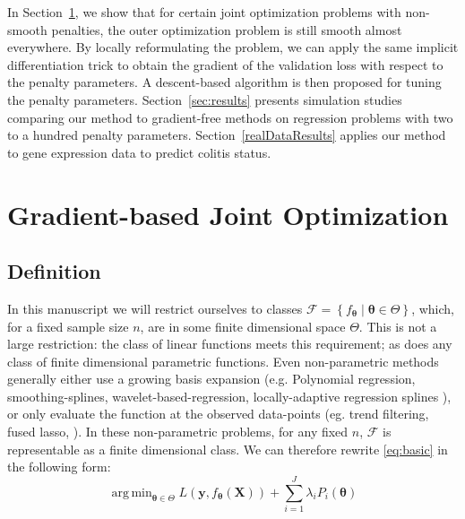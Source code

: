 \documentclass[12pt]{article}
\DeclareMathOperator*{\argmin}{arg\,min}
\begin{document}
In Section~\ref{defineDescJointOpt}, we show that for certain joint optimization problems with non-smooth penalties, the outer optimization problem is still smooth almost everywhere. By locally reformulating the problem, we can apply the same implicit differentiation trick to obtain the gradient of the validation loss with respect to the penalty parameters. A descent-based algorithm is then proposed for tuning the penalty parameters. Section~\ref{sec:results} presents simulation studies comparing our method to gradient-free methods on regression problems with two to a hundred penalty parameters. Section~\ref{realDataResults} applies our method to gene expression data to predict colitis status.

\section{Gradient-based Joint Optimization}\label{defineDescJointOpt}
\subsection{Definition}
In this manuscript we will restrict ourselves to classes $\mathcal{F} = \left\{f_{\boldsymbol \theta}\middle| \boldsymbol \theta\in\Theta\right\}$, which, for a fixed sample size $n$, are in some finite dimensional space $\Theta$. This is not a large restriction: the class of linear functions meets this requirement; as does any class of finite dimensional parametric functions. Even non-parametric methods generally either use a growing basis expansion (e.g. Polynomial regression, smoothing-splines, wavelet-based-regression, locally-adaptive regression splines \citep{tsybakov2008introduction, wahba1981spline, donoho1994ideal, mammen1997locally}), or only evaluate the function at the observed data-points (eg. trend filtering, fused lasso, \citep{kim2009ell_1, tibshirani2005sparsity}). In these non-parametric problems, for any fixed $n$, $\mathcal{F}$ is representable as a finite dimensional class.
We can therefore rewrite \eqref{eq:basic} in the following form:
\begin{equation}\label{eq:train_disc}
\argmin_{\boldsymbol \theta \in \Theta} L(\boldsymbol{y}, f_{\boldsymbol \theta}(\boldsymbol{X})) + \sum\limits_{i=1}^J \lambda_i P_i(\boldsymbol \theta)
\end{equation}
\end{document}
